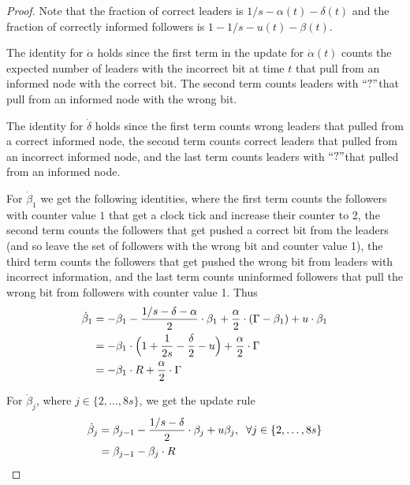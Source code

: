 \documentclass[a4paper,12pt]{article}
\newcommand{\q}{$``?"$}
\begin{document}
\begin{proof}
	Note that the fraction of correct leaders is $1/s - \alpha(t) - \delta(t)$ and the fraction of correctly informed followers is $1 - 1/s - u(t) - \beta(t)$.
	
	The identity for $\dot{\alpha}$ holds since the first term in the update for $\dot{\alpha}(t) $ counts the expected number of leaders with the incorrect bit at time $t$ that pull from an informed node with the correct bit. The second term counts leaders with \q that pull from an informed node with the wrong bit.
	
	The identity for $\dot{\delta}$ holds since the first term counts wrong leaders that pulled from a correct informed node, the second term counts correct leaders that pulled from an incorrect informed node, and the last term counts leaders with \q that pulled from an informed node.
	
	
	For $\dot{\beta}_1$ we get the following identities, where the first term counts the followers with counter value $1$ that get a clock tick and increase their counter to 2, the second term counts the followers that get pushed a correct bit from the leaders (and so leave the set of followers with the wrong bit and counter value 1), the third term counts the followers that get pushed the wrong bit from leaders with incorrect information, and the last term counts uninformed followers that pull the wrong bit from followers with counter value 1. Thus
	\begin{align}
	\dot{\beta}_1 & = - \beta_1 - \frac{1/s - \delta - \alpha}{2} \cdot \beta_1 + \frac{\alpha}{2} \cdot \left( \Gamma - \beta_1 \right) + u \cdot \beta_1 \\
	& = -\beta_1 \cdot \Bigl( 1 + \frac{1}{2s} - \frac{\delta}{2} - u\Bigr) +  \frac{\alpha}{2} \cdot \Gamma \\
	& = -\beta_1 \cdot R + \frac{\alpha}{2} \cdot \Gamma
	\end{align}
	
	For $\dot{\beta}_j$, where $j \in \{2, \ldots, 8s\}$, we get the update rule
	\begin{align}
	\dot{\beta}_j & = \beta_{j-1} - \frac{1/s - \delta}{2} \cdot \beta_j + u \beta_j, \; \; \forall j \in\{2, \ldots, 8s\} \notag \\
	& = \beta_{j-1} - \beta_j \cdot R
	\end{align}
	

\end{proof}
\end{document}
